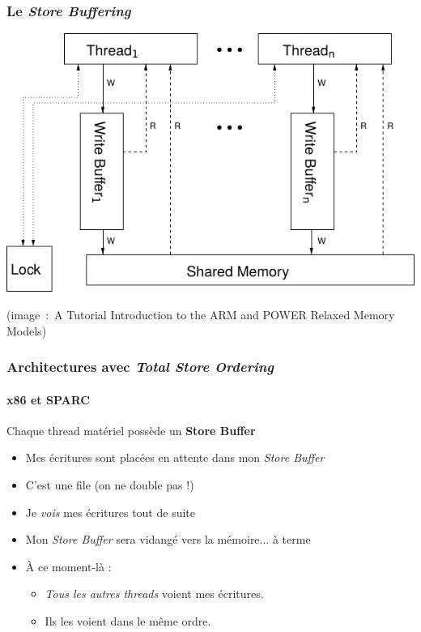\documentclass[xcolor={x11names,svgnames},x11names,svgnames]{beamer}
\begin{document}

\begin{frame}[label=tso]
  \frametitle{Le \emph{Store Buffering}}
  
  \centering
  \includegraphics[width=\textwidth]{tso}

  \medskip
  
  \scriptsize (image~:~A Tutorial
    Introduction to the ARM and POWER Relaxed Memory Models)
\end{frame}


\begin{frame}[label=tso]
  \frametitle{Architectures avec \emph{Total Store Ordering}}
  \framesubtitle{x86 et SPARC}
  
  \begin{block}{Chaque thread \alert{matériel} possède un \textbf{Store Buffer}}
    \begin{itemize}
    \item Mes écritures sont placées en attente dans mon \emph{Store Buffer}
    \item C'est une file (on ne double pas !)
    \item Je \emph{vois} mes écritures tout de suite
    \item Mon \emph{Store Buffer} \alert{sera} \og vidangé\fg{} vers la mémoire... à terme
    \item À ce moment-là :
      \begin{itemize}
      \item  \emph{Tous les autres threads} voient mes écritures.
      \item Ils les voient dans le même ordre.
      \end{itemize}
    \end{itemize}
  \end{block}
\end{frame}
\end{document}
